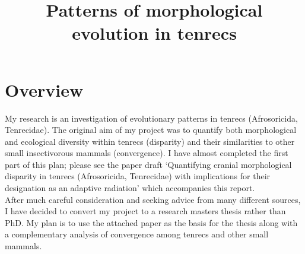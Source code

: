 \documentclass[12pt,a4paper]{article}
\begin{document}
\title{Patterns of morphological evolution in tenrecs}
\author{}
\date{}
\maketitle


\renewcommand{\headrulewidth}{0.0pt}
\thispagestyle{fancy}				%
\chead{}


\section{Overview}%


	My research is an investigation of evolutionary patterns in tenrecs (Afrosoricida,  Tenrecidae). The original aim of my project was to quantify both morphological and ecological diversity within tenrecs (disparity) and their similarities to other small insectivorous mammals (convergence). I have almost completed the first part of this plan; please see the paper draft `Quantifying cranial morphological disparity in tenrecs (Afrosoricida, Tenrecidae) with implications for their designation as an adaptive radiation' which accompanies this report.\\

	After much careful consideration and seeking advice from many different sources, I have decided to convert my project to a research masters thesis rather than PhD. My plan is to use the attached paper as the basis for the thesis along with a complementary analysis of convergence among tenrecs and other small mammals.\\ 
\end{document}
